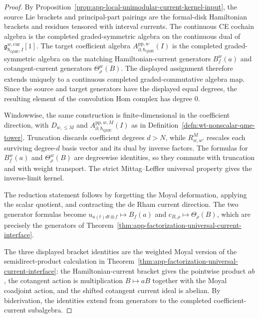 \begin{proof}
  By
  Proposition~\ref{prop:app-local-unimodular-current-kernel-input}, the
  source Lie brackets and principal-part pairings are the formal-disk
  Hamiltonian brackets and residues tensored with interval currents.  The
  continuous CE cochain algebra is the completed graded-symmetric
  algebra on the continuous dual of
  \(\mathfrak g^{w,\mathrm{cur}}_{\hbar_{\mathrm{QME}},I}[1]\).  The target coefficient
  algebra \(A^{\mathrm{pp},w}_{\partial,\hbar_{\mathrm{QME}}}(I)\) is the completed
  graded-symmetric algebra on the matching Hamiltonian-current generators
  \(B^w_f(a)\) and cotangent-current generators \(\Theta^w_\rho(B)\).
  The displayed assignment therefore extends uniquely to a continuous
  completed graded-commutative algebra map.  Since the source and target
  generators have the displayed equal degrees, the resulting element of the
  convolution Hom complex has degree \(0\).

  Windowwise, the same construction is finite-dimensional in the coefficient
  direction, with \(D_{w,\leq M}\) and
  \(A_{\partial,\hbar_{\mathrm{QME}}}^{\mathrm{pp},w,M}(I)\) as in
  Definition~\ref{defn:wt-nonscalar-qme-tower}.  Truncation discards
  coefficient degrees \(d>N\), while \(R^M_{w,w'}\) rescales each surviving
  degree-\(d\) basis vector and its dual by inverse factors.  The formulas
  for \(B^w_f(a)\) and \(\Theta^w_\rho(B)\) are degreewise identities, so
  they commute with truncation and with weight transport.  The strict
  Mittag--Leffler universal property gives the inverse-limit kernel.

  The reduction statement follows by forgetting the Moyal deformation,
  applying the scalar quotient, and contracting the de Rham current
  direction.  The two generator formulas become
  \(u_{a(t)dt\otimes f}\mapsto B_f(a)\) and
  \(c_{B,\rho}\mapsto\Theta_\rho(B)\), which are precisely the generators
  of Theorem~\ref{thm:app-factorization-universal-current-interface}.

  The three displayed bracket identities are the weighted Moyal version of
  the semidirect-product calculation in
  Theorem~\ref{thm:app-factorization-universal-current-interface}: the
  Hamiltonian-current bracket gives the pointwise product \(ab\), the
  cotangent action is multiplication \(B\mapsto aB\) together with the
  Moyal coadjoint action, and the shifted cotangent current ideal is
  abelian.  By biderivation, the identities extend from generators to the
  completed coefficient-current subalgebra.


\end{proof}
